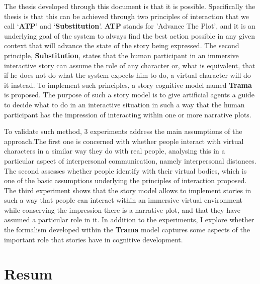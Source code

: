 \documentclass[11pt,a4paper,pdftex,headexclude,smallheadings,pointlessnumbers,bibtotoc,idxtotoc,twoside,authordate1-4]{report}
\begin{document}
The thesis developed through this document is that it is possible. Specifically the thesis is that this can be achieved through two principles of interaction that we call `\textbf{ATP}' and `\textbf{Substitution}'. \textbf{ATP} stands for 'Advance The Plot', and it is an underlying goal of the system to always find the best action possible in any given context that will advance the state of the story being expressed. The second principle, \textbf{Substitution}, states that the human participant in an immersive interactive story can assume the role of any character or, what is equivalent, that if he does not do what the system expects him to do, a virtual character will do it instead. To implement such principles, a story cognitive model named \textbf{Trama} is proposed. The purpose of such a story model is to give artificial agents a guide to decide what to do in an interactive situation in such a way that the human participant has the impression of interacting within one or more narrative plots. 

To validate such method, 3 experiments address the main assumptions of the approach.The first one is concerned with  whether people interact with virtual characters in a similar way they do with real people, analysing this in a particular aspect of interpersonal communication, namely interpersonal distances. The second assesses whether people identify with their virtual bodies, which is one of the basic assumptions underlying the principles of interaction proposed.  
The third experiment shows that the story model allows to implement stories in such a way that  people can interact within an immersive virtual environment while conserving the impression there is a narrative plot, and that they have assumed a particular role in it. 
In addition to the experiments, I explore whether the formalism developed within the \textbf{Trama} model captures some aspects of the important role that stories have in cognitive development. 

\clearpage



\chapter*{Resum}
\end{document}
